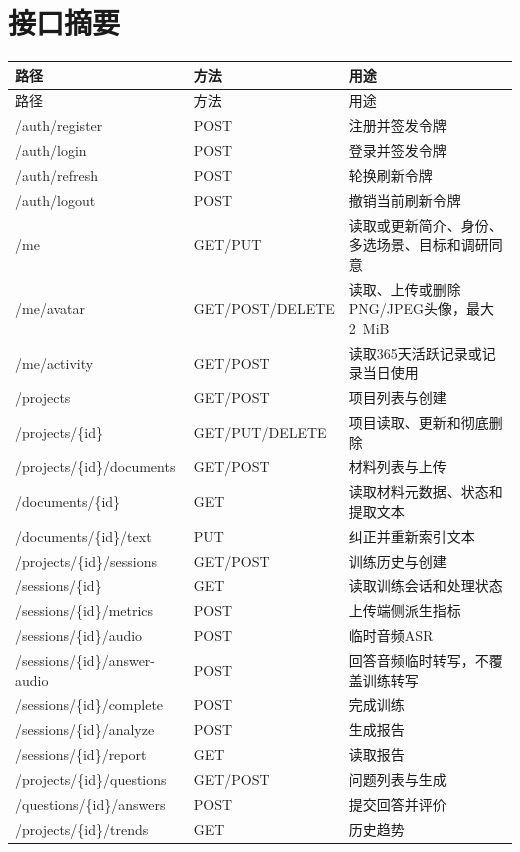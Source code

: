 \chapter{接口摘要}
\begin{longtable}{>{\raggedright\arraybackslash}p{4.5cm}>{\raggedright\arraybackslash}p{2.7cm}p{6.8cm}}
\toprule 路径 & 方法 & 用途 \\
\midrule
\endfirsthead
\toprule 路径 & 方法 & 用途 \\
\midrule
\endhead
/auth/register & POST & 注册并签发令牌 \\
/auth/login & POST & 登录并签发令牌 \\
/auth/refresh & POST & 轮换刷新令牌 \\
/auth/logout & POST & 撤销当前刷新令牌 \\
/me & GET/PUT & 读取或更新简介、身份、多选场景、目标和调研同意 \\
/me/avatar & GET/\allowbreak POST/\allowbreak DELETE & 读取、上传或删除PNG/JPEG头像，最大2~MiB \\
/me/activity & GET/POST & 读取365天活跃记录或记录当日使用 \\
/projects & GET/POST & 项目列表与创建 \\
/projects/\{id\} & GET/\allowbreak PUT/\allowbreak DELETE & 项目读取、更新和彻底删除 \\
/projects/\{id\}/\allowbreak documents & GET/\allowbreak POST & 材料列表与上传 \\
/documents/\{id\} & GET & 读取材料元数据、状态和提取文本 \\
/documents/\{id\}/\allowbreak text & PUT & 纠正并重新索引文本 \\
/projects/\{id\}/\allowbreak sessions & GET/\allowbreak POST & 训练历史与创建 \\
/sessions/\{id\} & GET & 读取训练会话和处理状态 \\
/sessions/\{id\}/\allowbreak metrics & POST & 上传端侧派生指标 \\
/sessions/\{id\}/\allowbreak audio & POST & 临时音频ASR \\
/sessions/\{id\}/\allowbreak answer-audio & POST & 回答音频临时转写，不覆盖训练转写 \\
/sessions/\{id\}/\allowbreak complete & POST & 完成训练 \\
/sessions/\{id\}/\allowbreak analyze & POST & 生成报告 \\
/sessions/\{id\}/\allowbreak report & GET & 读取报告 \\
/projects/\{id\}/\allowbreak questions & GET/\allowbreak POST & 问题列表与生成 \\
/questions/\{id\}/\allowbreak answers & POST & 提交回答并评价 \\
/projects/\{id\}/\allowbreak trends & GET & 历史趋势 \\
\bottomrule
\end{longtable}

